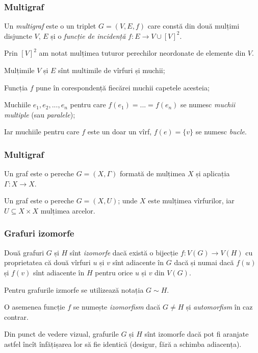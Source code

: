 \begin{frame}
  \frametitle{Multigraf}

\begin{definition}
Un \emph{multigraf} este o un triplet $G=(V,E,f)$ care constă  din
două mulțimi disjuncte $V$, $E$ și o \emph{funcție de incidență} $f:E\to V\cup [V]^2$.
\end{definition}

Prin $[V]^2$ am notat mulțimea tuturor perechilor neordonate de elemente din $V$.

Mulțimile $V$ și $E$ sînt multimile de vîrfuri și muchii;

Funcția $f$ pune în corespondență fiecărei muchii capetele acesteia;

Muchiile $e_1, e_2, ...,e_n$ pentru care $f(e_1)=...=f(e_n)$ se numesc \emph{muchii multiple} (sau \emph{paralele});

Iar muchiile pentru care $f$ este un doar un vîrf, $f(e)=\{v\}$ se numesc \emph{bucle}.

\end{frame}

\begin{frame}
  \frametitle{Multigraf}

\begin{definition}
Un graf este o pereche $G=(X,\Gamma)$ formată de mulțimea $X$ și aplicația $\Gamma:X\to X$. 
\end{definition}

\begin{definition}
Un graf este o pereche $G=(X,U)$; unde $X$ este mulțimea vîrfurilor, iar $U\subseteq X\times X$ mulțimea arcelor.
\end{definition}

\end{frame}


\begin{frame}
  \frametitle{Grafuri izomorfe}

\begin{definition}
Două grafuri $G$ și $H$ sînt \emph{izomorfe} dacă există o bijecție $f:V(G)\to V(H)$ cu proprietatea că două vîrfuri $u$ și $v$ sînt adiacente în $G$ dacă și numai dacă $f(u)$ și $f(v)$ sînt adiacente în $H$ pentru orice $u$ și $v$ din $V(G)$. 
\end{definition}

Pentru grafurile izmorfe se utilizează notația $G\sim H$.

O asemenea funcție $f$ se numește \emph{izomorfism} dacă $G \neq H$ și \emph{automorfism} în caz contrar.

Din punct de vedere vizual, grafurile $G$ și $H$ sînt izomorfe dacă pot fi aranjate astfel încît înfățișarea lor să fie identică (desigur, fără a schimba adiacența).

\end{frame}

